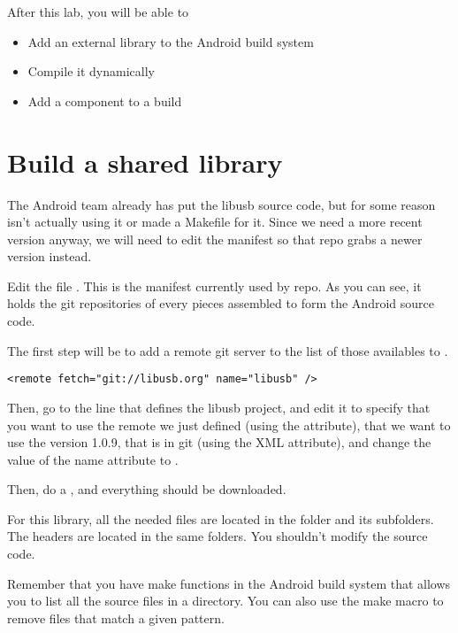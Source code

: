 
After this lab, you will be able to
\begin{itemize}
  \item Add an external library to the Android build system
  \item Compile it dynamically
  \item Add a component to a build
\end{itemize}

\section{Build a shared library}

The Android team already has put the libusb source code, but for some
reason isn't actually using it or made a Makefile for it. Since we
need a more recent version anyway, we will need to edit the manifest
so that repo grabs a newer version instead.

Edit the file . This is the manifest
currently used by repo. As you can see, it holds the git repositories
of every pieces assembled to form the Android source code.

The first step will be to add a remote git server to the list of those
availables to .

\begin{verbatim}
<remote fetch="git://libusb.org" name="libusb" />
\end{verbatim}

Then, go to the line that defines the libusb project, and edit it to
specify that you want to use the remote we just defined (using the
 attribute), that we want to use the version 1.0.9, that
is in git  (using the  XML
attribute), and change the value of the name attribute to
.

Then, do a , and everything should be downloaded.

For this library, all the needed  files are located in the
 folder and its subfolders. The headers are located in
the same folders. You shouldn't modify the  source code.

Remember that you have make functions in the Android build system that
allows you to list all the source files in a directory. You can also
use the  make macro to remove files that match a
given pattern.

